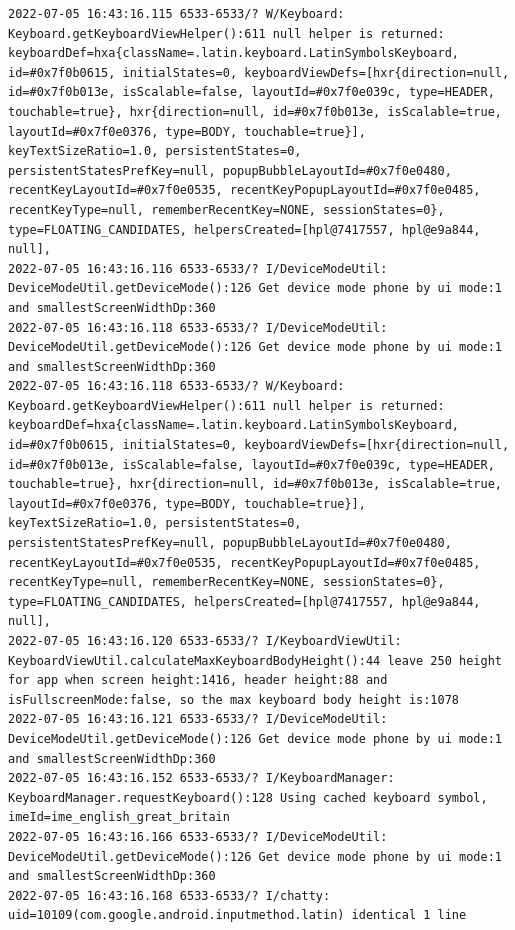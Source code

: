 \documentclass[a4paper,12pt]{book}
\begin{document}
\begin{lstlisting}
2022-07-05 16:43:16.115 6533-6533/? W/Keyboard: Keyboard.getKeyboardViewHelper():611 null helper is returned: keyboardDef=hxa{className=.latin.keyboard.LatinSymbolsKeyboard, id=#0x7f0b0615, initialStates=0, keyboardViewDefs=[hxr{direction=null, id=#0x7f0b013e, isScalable=false, layoutId=#0x7f0e039c, type=HEADER, touchable=true}, hxr{direction=null, id=#0x7f0b013e, isScalable=true, layoutId=#0x7f0e0376, type=BODY, touchable=true}], keyTextSizeRatio=1.0, persistentStates=0, persistentStatesPrefKey=null, popupBubbleLayoutId=#0x7f0e0480, recentKeyLayoutId=#0x7f0e0535, recentKeyPopupLayoutId=#0x7f0e0485, recentKeyType=null, rememberRecentKey=NONE, sessionStates=0}, type=FLOATING_CANDIDATES, helpersCreated=[hpl@7417557, hpl@e9a844, null], 
2022-07-05 16:43:16.116 6533-6533/? I/DeviceModeUtil: DeviceModeUtil.getDeviceMode():126 Get device mode phone by ui mode:1 and smallestScreenWidthDp:360
2022-07-05 16:43:16.118 6533-6533/? I/DeviceModeUtil: DeviceModeUtil.getDeviceMode():126 Get device mode phone by ui mode:1 and smallestScreenWidthDp:360
2022-07-05 16:43:16.118 6533-6533/? W/Keyboard: Keyboard.getKeyboardViewHelper():611 null helper is returned: keyboardDef=hxa{className=.latin.keyboard.LatinSymbolsKeyboard, id=#0x7f0b0615, initialStates=0, keyboardViewDefs=[hxr{direction=null, id=#0x7f0b013e, isScalable=false, layoutId=#0x7f0e039c, type=HEADER, touchable=true}, hxr{direction=null, id=#0x7f0b013e, isScalable=true, layoutId=#0x7f0e0376, type=BODY, touchable=true}], keyTextSizeRatio=1.0, persistentStates=0, persistentStatesPrefKey=null, popupBubbleLayoutId=#0x7f0e0480, recentKeyLayoutId=#0x7f0e0535, recentKeyPopupLayoutId=#0x7f0e0485, recentKeyType=null, rememberRecentKey=NONE, sessionStates=0}, type=FLOATING_CANDIDATES, helpersCreated=[hpl@7417557, hpl@e9a844, null], 
2022-07-05 16:43:16.120 6533-6533/? I/KeyboardViewUtil: KeyboardViewUtil.calculateMaxKeyboardBodyHeight():44 leave 250 height for app when screen height:1416, header height:88 and isFullscreenMode:false, so the max keyboard body height is:1078
2022-07-05 16:43:16.121 6533-6533/? I/DeviceModeUtil: DeviceModeUtil.getDeviceMode():126 Get device mode phone by ui mode:1 and smallestScreenWidthDp:360
2022-07-05 16:43:16.152 6533-6533/? I/KeyboardManager: KeyboardManager.requestKeyboard():128 Using cached keyboard symbol, imeId=ime_english_great_britain
2022-07-05 16:43:16.166 6533-6533/? I/DeviceModeUtil: DeviceModeUtil.getDeviceMode():126 Get device mode phone by ui mode:1 and smallestScreenWidthDp:360
2022-07-05 16:43:16.168 6533-6533/? I/chatty: uid=10109(com.google.android.inputmethod.latin) identical 1 line

\end{lstlisting}
\end{document}
